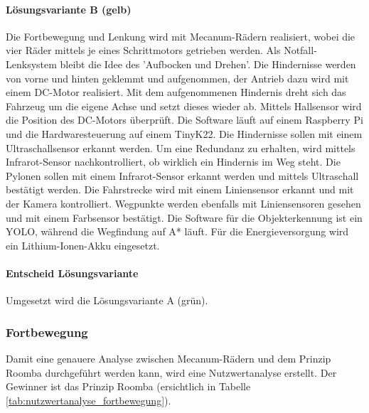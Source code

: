 \documentclass[../main.tex]{subfiles}
\begin{document}
    \paragraph{Lösungsvariante B (gelb)}
    Die Fortbewegung und Lenkung wird mit Mecanum-Rädern realisiert, wobei die vier Räder mittels je eines Schrittmotors getrieben werden. Als Notfall-Lenksystem bleibt die Idee des 'Aufbocken und Drehen'. Die Hindernisse werden von vorne und hinten geklemmt und aufgenommen, der Antrieb dazu wird mit einem DC-Motor realisiert. Mit dem aufgenommenen Hindernis dreht sich das Fahrzeug um die eigene Achse und setzt dieses wieder ab. Mittels Hallsensor wird die Position des DC-Motors überprüft. Die Software läuft auf einem Raspberry Pi und die Hardwaresteuerung auf einem TinyK22. Die Hindernisse sollen mit einem Ultraschallsensor erkannt werden. Um eine Redundanz zu erhalten, wird mittels Infrarot-Sensor nachkontrolliert, ob wirklich ein Hindernis im Weg steht. Die Pylonen sollen mit einem Infrarot-Sensor erkannt werden und mittels Ultraschall bestätigt werden. Die Fahrstrecke wird mit einem Liniensensor erkannt und mit der Kamera kontrolliert. Wegpunkte werden ebenfalls mit Liniensensoren gesehen und mit einem Farbsensor bestätigt. Die Software für die Objekterkennung ist ein YOLO, während die Wegfindung auf A* läuft. Für die Energieversorgung wird ein Lithium-Ionen-Akku eingesetzt.

    \paragraph{Entscheid Lösungsvariante}
    Umgesetzt wird die Lösungsvariante A (grün).
    
    \subsubsection{Fortbewegung}

    Damit eine genauere Analyse zwischen Mecanum-Rädern und dem Prinzip Roomba durchgeführt werden kann, wird eine Nutzwertanalyse erstellt. Der Gewinner ist das Prinzip Roomba (ersichtlich in Tabelle \ref{tab:nutzwertanalyse_fortbewegung}).
\end{document}
